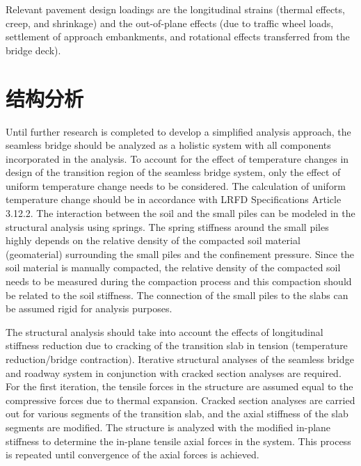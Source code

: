 Relevant pavement design loadings are the longitudinal strains (thermal effects, creep, and shrinkage) and the out-of-plane effects (due to traffic wheel loads, settlement of approach embankments, and rotational effects transferred from the bridge deck).

\section{结构分析}
Until further research is completed to develop a simplified analysis approach, the seamless bridge should be analyzed as a holistic system with all components incorporated in the analysis. To account for the effect of temperature changes in design of the transition region of the seamless bridge system, only the effect of uniform temperature change needs to be considered. The calculation of uniform temperature change should be in accordance with LRFD Specifications Article 3.12.2. The interaction between the soil and the small piles can be modeled in the structural analysis using springs. The spring stiffness around the small piles highly depends on the relative density of the compacted soil material (geomaterial) surrounding the small piles and the confinement pressure. Since the soil material is manually compacted, the relative density of the compacted soil needs to be measured during the compaction process and this compaction should be related to the soil stiffness. The connection of the small piles to the slabs can be assumed rigid for analysis purposes.

The structural analysis should take into account the effects of longitudinal stiffness reduction due to cracking of the transition slab in tension (temperature reduction/bridge contraction). Iterative structural analyses of the seamless bridge and roadway system in conjunction with cracked section analyses are required. For the first iteration, the tensile forces in the structure are assumed equal to the compressive forces due to thermal expansion. Cracked section analyses are carried out for various segments of the transition slab, and the axial stiffness of the slab segments are modified. The structure is analyzed with the modified in-plane stiffness to determine the in-plane tensile axial forces in the system. This process is repeated until convergence of the axial forces is achieved.

